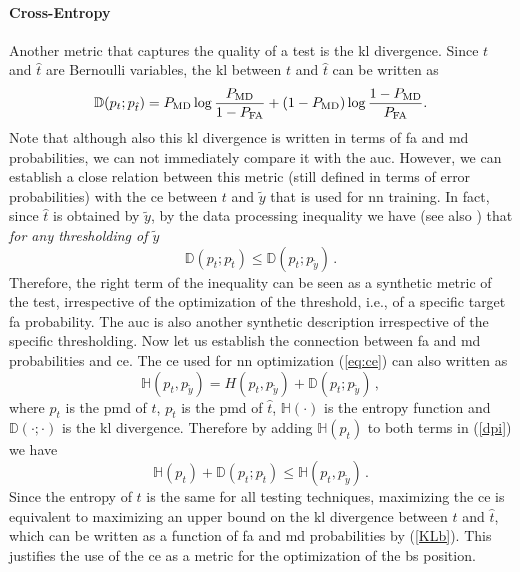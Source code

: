 \documentclass[conference]{IEEEtran}
\begin{document}
\paragraph{Cross-Entropy} Another metric that captures the quality of a test is the \ac{kl} divergence. Since $t$ and $\hat{t}$ are Bernoulli variables, the \ac{kl} between $t$ and $\hat{t}$ can be written as 
\begin{equation}
\mathbb D(p_t; p_{\hat{t}}) = P_{\rm MD} \log \frac{P_{\rm MD}}{1 - P_{\rm FA}} + (1-P_{\rm MD})\log \frac{1- P_{\rm MD}}{P_{\rm FA}}.
\label{KLb}
\end{equation}
Note that although also this \ac{kl} divergence is written in terms of \ac{fa} and \ac{md} probabilities, we can not immediately compare it with the \ac{auc}. However, we can establish a close relation between this metric (still defined in terms of error probabilities) with the \ac{ce} between $t$ and $\tilde{y}$ that is used for \ac{nn} training. In fact, since $\hat{t}$ is obtained by $\tilde{y}$, by the data processing inequality we have (see also \cite{Tomasin-Ferrante}) that {\em for any thresholding of $\tilde{y}$}
\begin{equation}
\mathbb D(p_t; p_{\hat{t}}) \leq \mathbb D(p_t; p_{\tilde{y}})\,.
\end{equation}
Therefore, the right term of the inequality can be seen as a synthetic metric of the test, irrespective of the optimization of the threshold, i.e., of a specific target \ac{fa} probability. The \ac{auc} is also another synthetic description irrespective of the specific thresholding. Now let us establish the connection between \ac{fa} and \ac{md} probabilities and \ac{ce}. The \ac{ce} used for \ac{nn} optimization (\ref{eq:ce})  can also written as 
\begin{equation}
\mathbb H(p_t,p_{\tilde{y}}) = H(p_t,p_{\tilde{y}}) +\mathbb D(p_t; p_{\tilde{y}})\,,
\label{dpi}
\end{equation}
where $p_t$ is the \ac{pmd} of $t$, $p_{\hat{t}}$ is the \ac{pmd} of $\hat{t}$, $\mathbb H(\cdot)$ is the entropy function and $\mathbb D(\cdot;\cdot)$ is the \ac{kl} divergence. Therefore by  adding $\mathbb H(p_t)$ to both terms in (\ref{dpi}) we have 
\begin{equation}
\mathbb H(p_t) +\mathbb  D(p_t; p_{\hat{t}}) \leq \mathbb H(p_t,p_{\tilde{y}})\,. 
\end{equation}
Since the entropy of $t$ is the same for all testing techniques, maximizing the \ac{ce} is equivalent to maximizing an upper bound on the \ac{kl} divergence between $t$ and $\hat{t}$, which can be written as a function of \ac{fa} and \ac{md} probabilities by (\ref{KLb}). This justifies the use of the \ac{ce} as a metric for the optimization of the \ac{bs} position.
\end{document}

